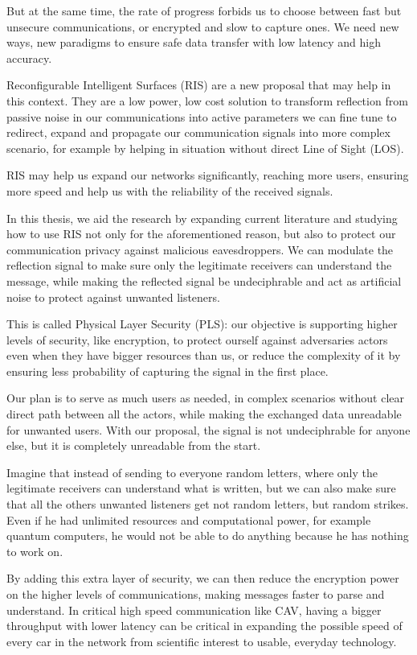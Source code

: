 But at the same time, the rate of progress forbids us to choose between fast but unsecure communications, or encrypted and slow to capture ones. We need new ways, new paradigms to ensure safe data transfer with low latency and high accuracy.

Reconfigurable Intelligent Surfaces (RIS) are a new proposal that may help in this context. They are a low power, low cost solution to transform reflection from passive noise in our communications into active parameters we can fine tune to redirect, expand and propagate our communication signals into more complex scenario, for example by helping in situation without direct Line of Sight (LOS).

RIS may help us expand our networks significantly, reaching more users, ensuring more speed and help us with the reliability of the received signals.

In this thesis, we aid the research by expanding current literature and studying how to use RIS not only for the aforementioned reason, but also to protect our communication privacy against malicious eavesdroppers. We can modulate the reflection signal to make sure only the legitimate receivers can understand the message, while making the reflected signal be undeciphrable and act as artificial noise to protect against unwanted listeners.

This is called Physical Layer Security (PLS): our objective is supporting higher levels of security, like encryption, to protect ourself against adversaries actors even when they have bigger resources than us, or reduce the complexity of it by ensuring less probability of capturing the signal in the first place.

Our plan is to serve as much users as needed, in complex scenarios without clear direct path between all the actors, while making the exchanged data unreadable for unwanted users. With our proposal, the signal is not undeciphrable for anyone else, but it is completely unreadable from the start.

Imagine that instead of sending to everyone random letters, where only the legitimate receivers can understand what is written, but we can also make sure that all the others unwanted listeners get not random letters, but random strikes. Even if he had unlimited resources and computational power, for example quantum computers, he would not be able to do anything because he has nothing to work on.

By adding this extra layer of security, we can then reduce the encryption power on the higher levels of communications, making messages faster to parse and understand. In critical high speed communication like CAV, having a bigger throughput with lower latency can be critical in expanding the possible speed of every car in the network from scientific interest to usable, everyday technology.

